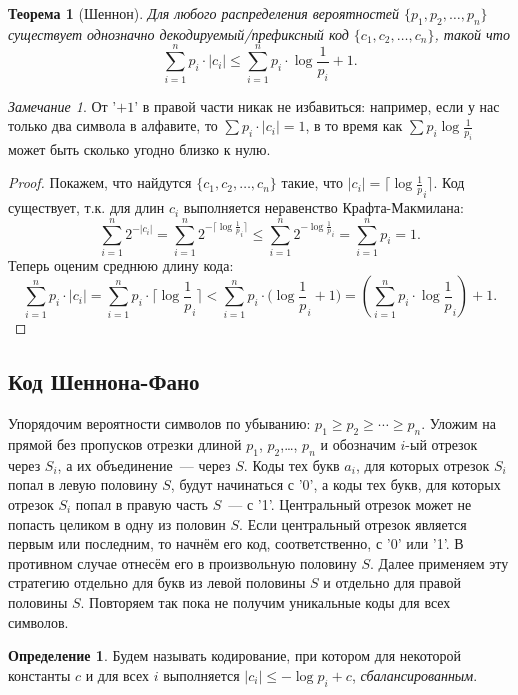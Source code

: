 \documentclass[12pt]{article}
\newcommand{\seqn}[2]{{#1}_1,{#1}_2,\dotsc,{#1}_{#2}}
\theoremstyle{definition}
\newtheorem{definition}{Определение}
\theoremstyle{plain}
\newtheorem{theorem}{Теорема}[section]
\theoremstyle{remark}
\newtheorem{remark}{Замечание}[section]
\begin{document}
\begin{theorem}[Шеннон]\label{thm:shannon:optcode}
    Для любого распределения вероятностей $\{\seqn{p}{n}\}$ существует
    однозначно декодируемый/префиксный код $\{\seqn{c}{n}\}$, такой что
    \[
        \sum_{i=1}^n p_i\cdot|c_i|\le \sum_{i=1}^n p_i\cdot \log\frac1{p_i} + 1. 
    \]
\end{theorem}
\begin{remark}
    От '$+1$' в правой части никак не избавиться: например, если у нас только два символа в
    алфавите, то $\sum p_i\cdot|c_i| = 1$, в то время как $\sum
    p_i\log\frac{1}{p_i}$ может быть сколько угодно близко к нулю.
\end{remark}

\begin{proof}
    Покажем, что найдутся \(\{\seqn{c}{n}\}\) такие, что $|c_i| =
    \bigl\lceil\log\frac1p_i \bigr\rceil$. Код существует, т.к. для длин $c_i$ выполняется
    неравенство Крафта-Макмилана:
    \[
        \sum_{i=1}^n 2^{-|c_i|} =  
        \sum_{i=1}^n 2^{-\lceil\log\frac1p_i \rceil} \le  
        \sum_{i=1}^n 2^{-\log\frac1p_i} = 
        \sum_{i=1}^n p_i = 1. 
    \]
    Теперь оценим среднюю длину кода:
    \[
        \sum_{i=1}^n p_i\cdot |c_i| =  
        \sum_{i=1}^n p_i\cdot \bigl\lceil\log{\textstyle\frac1p_i} \bigr\rceil < 
        \sum_{i=1}^n p_i\cdot \bigl(\log{\textstyle\frac1p_i} + 1\bigr) =
        \left(\sum_{i=1}^n p_i\cdot \log{\textstyle\frac1p_i}\right) + 1.
    \]
\end{proof}
\subsection{Код Шеннона-Фано}
Упорядочим вероятности символов по убыванию: $p_1\ge p_2\ge\dotsb\ge p_n$.
Уложим на прямой без пропусков отрезки длиной $p_1$, $p_2$,\ldots, $p_n$
и обозначим $i$-ый отрезок через $S_i$, а их объединение~--- через $S$.
Коды тех букв $a_i$, для которых отрезок $S_i$ попал в левую половину $S$,
будут начинаться с '0', а коды тех букв, для которых отрезок $S_i$ попал
в правую часть $S$~--- с '1'. Центральный отрезок может не попасть
целиком в одну из половин $S$. Если центральный отрезок является первым
или последним, то начнём его код, соответственно, с '0' или '1'.
В противном случае отнесём его в произвольную половину $S$. Далее
применяем эту стратегию отдельно для букв из левой половины $S$ и отдельно для
правой половины $S$. Повторяем так пока не получим уникальные коды для всех
символов.     

\begin{definition}
    Будем называть кодирование, при котором для некоторой константы $c$ и для
    всех $i$ выполняется $|c_i|\le - \log p_i + c$, \emph{сбалансированным}.
\end{definition}
\end{document}

